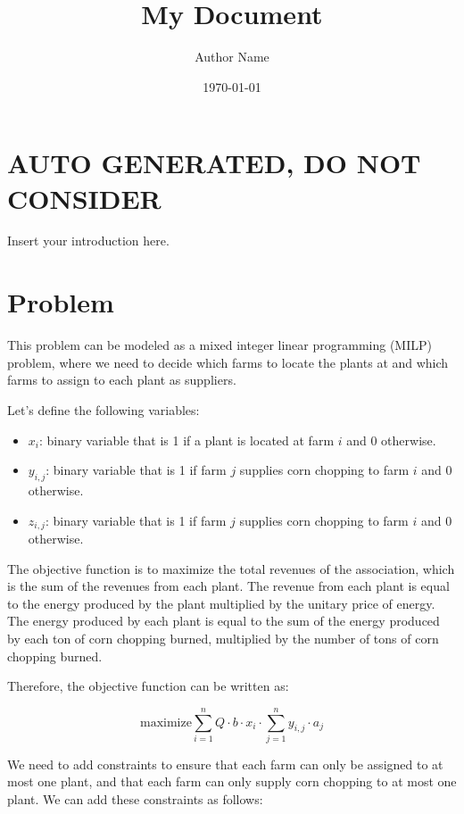 \documentclass{article}
\begin{document}
\title{My Document}
\author{Author Name}
\date{\today}
\maketitle

\section{AUTO GENERATED, DO NOT CONSIDER}

Insert your introduction here.

\section{Problem}

This problem can be modeled as a mixed integer linear programming (MILP) problem, where we need to decide which 
farms to locate the plants at and which farms to assign to each plant as suppliers.

Let's define the following variables:
\begin{itemize}
    \item $x_i$: binary variable that is 1 if a plant is located at farm $i$ and 0 otherwise.
    \item  $y_{i,j}$: binary variable that is 1 if farm $j$ supplies corn chopping to farm $i$ and 0 otherwise.
    \item  $z_{i,j}$: binary variable that is 1 if farm $j$ supplies corn chopping to farm $i$ and 0 otherwise.

\end{itemize}

The objective function is to maximize the total revenues of the association, which is the sum of the revenues from each plant. The revenue from each plant is equal to the energy produced by the plant multiplied by the unitary price of energy. The energy produced by each plant is equal to the sum of the energy produced by each ton of corn chopping burned, multiplied by the number of tons of corn chopping burned.

Therefore, the objective function can be written as:

$$\text{maximize} \sum_{i=1}^n Q \cdot b \cdot x_i \cdot \sum_{j=1}^n y_{i,j} \cdot a_j$$

We need to add constraints to ensure that each farm can 
only be assigned to at most one plant, and that each farm can only supply corn chopping to at most one plant. We can add these constraints as follows:
\end{document}

